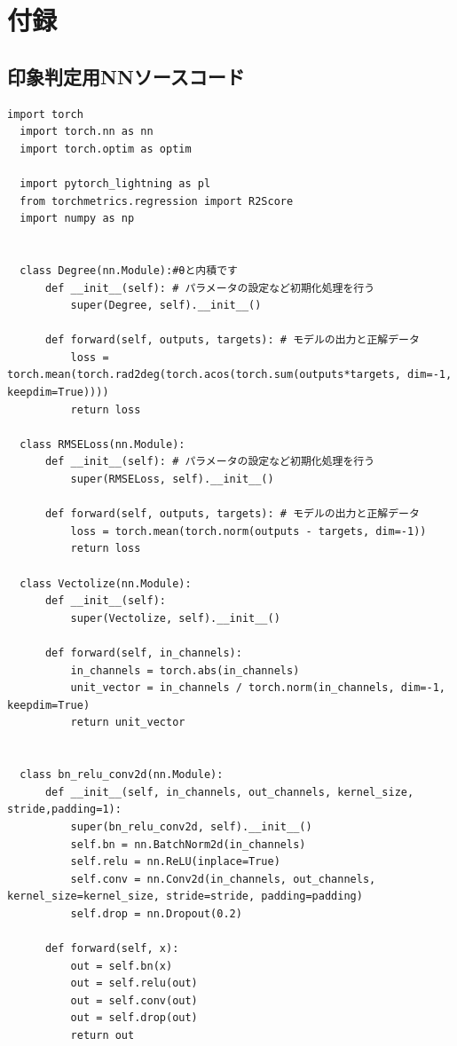 \documentclass[a4paper,11pt,dvipdfmx]{jreport}
\begin{document}
\newpage

\chapter*{付録}
\section*{印象判定用NNソースコード}
\begin{lstlisting}[caption=印象判定用NN{,} DenseNetに関するソースコード, label=source]
  import torch
  import torch.nn as nn
  import torch.optim as optim
  
  import pytorch_lightning as pl
  from torchmetrics.regression import R2Score
  import numpy as np
  
  
  class Degree(nn.Module):#θと内積です
      def __init__(self): # パラメータの設定など初期化処理を行う
          super(Degree, self).__init__()
  
      def forward(self, outputs, targets): # モデルの出力と正解データ
          loss = torch.mean(torch.rad2deg(torch.acos(torch.sum(outputs*targets, dim=-1, keepdim=True))))
          return loss
  
  class RMSELoss(nn.Module):
      def __init__(self): # パラメータの設定など初期化処理を行う
          super(RMSELoss, self).__init__()
  
      def forward(self, outputs, targets): # モデルの出力と正解データ
          loss = torch.mean(torch.norm(outputs - targets, dim=-1))
          return loss
  
  class Vectolize(nn.Module):
      def __init__(self):
          super(Vectolize, self).__init__()
  
      def forward(self, in_channels):
          in_channels = torch.abs(in_channels)
          unit_vector = in_channels / torch.norm(in_channels, dim=-1, keepdim=True)
          return unit_vector
  
  
  class bn_relu_conv2d(nn.Module):
      def __init__(self, in_channels, out_channels, kernel_size, stride,padding=1):
          super(bn_relu_conv2d, self).__init__()
          self.bn = nn.BatchNorm2d(in_channels)
          self.relu = nn.ReLU(inplace=True)
          self.conv = nn.Conv2d(in_channels, out_channels, kernel_size=kernel_size, stride=stride, padding=padding)
          self.drop = nn.Dropout(0.2)
  
      def forward(self, x):
          out = self.bn(x)
          out = self.relu(out)
          out = self.conv(out)
          out = self.drop(out)
          return out
  

\end{lstlisting}
\end{document}
